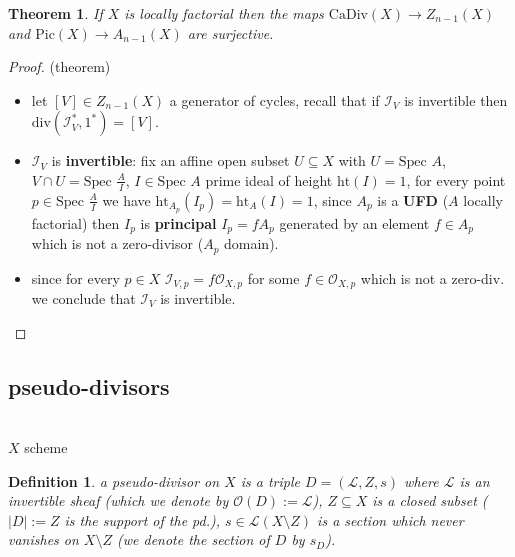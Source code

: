 \documentclass[oneside,a4paper,11pt]{amsbook}
\theoremstyle{pl}
\newtheorem{teo}{Theorem}[chapter]
\theoremstyle{df}
\newtheorem*{dfn}{Definition}
\theoremstyle{rm}
\newcommand{\nline}{
~\\
}%
\newcommand{\pa}[1]{
\left(#1\right)
}
\newcommand{\mc}[1]{
\mathcal{#1}
}
\newcommand{\spc}[1]{
\text{Spec }#1
}
\newcommand{\dv}[1]{
\text{div}\pa{#1}
}
\begin{document}
\begin{teo}
If $X$ is locally factorial then the maps $\text{CaDiv}(X)\rightarrow Z_{n-1}(X)$ and $\text{Pic}(X)\rightarrow A_{n-1}(X)$ are surjective.
\end{teo}



\begin{proof}(theorem)
\begin{itemize}
\item{let $[V]\in Z_{n-1}(X)$ a generator of cycles, recall that if $\mc{I}_V$ is invertible then $\dv{\mc{I}_V^*,1^*}=[V]$.}
\item{$\mc{I}_V$ is \textbf{invertible}: fix an affine open subset $U\subseteq X$ with $U=\spc A$, $V\cap U=\spc{\frac{A}{I}}$, $I\in\spc A$ prime ideal of height $\text{ht}(I)=1$, for every point $p\in\spc{\frac{A}{I}}$ we have $\text{ht}_{A_p}\pa{I_p}=\text{ht}_A(I)=1$, since $A_p$ is a \textbf{UFD} ($A$ locally factorial) then $I_p$ is \textbf{principal} $I_p=fA_p$ generated by an element $f\in A_p$ which is not a zero-divisor ($A_p$ domain).}
\item{since for every $p\in X$ $\mc{I}_{V,p}=f\mc{O}_{X,p}$ for some $f\in\mc{O}_{X,p}$ which is not a zero-div. we conclude that $\mc{I}_V$ is invertible.}
\end{itemize}
\end{proof}

\subsection{pseudo-divisors}
\nline
$X$ scheme

\begin{dfn}
a \emph{pseudo-divisor} on $X$ is a triple $D=\pa{\mc{L},Z,s}$ where $\mc{L}$ is an invertible sheaf (which we denote by $\mc{O}(D):=\mc{L}$), $Z\subseteq X$ is a closed subset ($|D|:=Z$ is the \emph{support} of the pd.), $s\in\mc{L}\pa{X\setminus Z}$ is a section which never vanishes on $X\setminus Z$ (we denote the section of $D$ by $s_D$).
\end{dfn}
\end{document}
